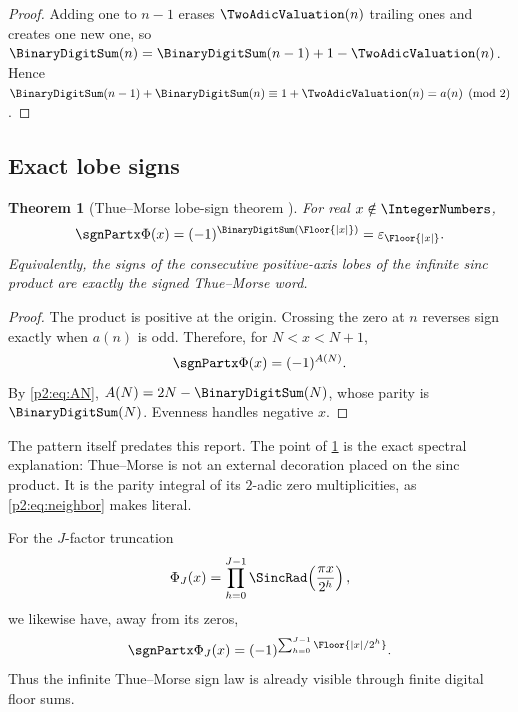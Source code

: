\documentclass[11pt]{article}
\numberwithin{equation}{section}
\newtheorem{theorem}{Theorem}[section]
\theoremstyle{definition}
\theoremstyle{remark}
\begin{document}
\begin{proof}
Adding one to $n-1$ erases $\TwoAdicValuation(n)$ trailing ones and creates one new one, so
$\BinaryDigitSum(n)=\BinaryDigitSum(n-1)+1-\TwoAdicValuation(n)$.  Hence
$\BinaryDigitSum(n-1)+\BinaryDigitSum(n)\equiv1+\TwoAdicValuation(n)=a(n)\pmod2$.
\end{proof}

\subsection{Exact lobe signs}

\begin{theorem}[Thue--Morse lobe-sign theorem \Observed]
\label{p2:thm:lobe-sign}
For real $x\notin\IntegerNumbers$,
\begin{equation}
 \sgnPartx\Phi(x)=(-1)^{\BinaryDigitSum(\Floor{|x|})}
             =\varepsilon_{\Floor{|x|}}.                  \label{p2:eq:lobe-sign}
\end{equation}
Equivalently, the signs of the consecutive positive-axis lobes of the infinite
sinc product are exactly the signed Thue--Morse word.
\end{theorem}

\begin{proof}
The product is positive at the origin.  Crossing the zero at $n$ reverses sign
exactly when $a(n)$ is odd.  Therefore, for $N<x<N+1$,
\[
 \sgnPartx\Phi(x)=(-1)^{A(N)}.
\]
By \eqref{p2:eq:AN}, $A(N)=2N-\BinaryDigitSum(N)$, whose parity is $\BinaryDigitSum(N)$.  Evenness handles
negative $x$.
\end{proof}

\begin{remark}
The pattern itself predates this report.  The point of
\cref{p2:thm:lobe-sign} is the exact spectral explanation: Thue--Morse is not an
external decoration placed on the sinc product.  It is the parity integral of
its $2$-adic zero multiplicities, as \eqref{p2:eq:neighbor} makes literal.
\end{remark}

For the $J$-factor truncation
\begin{equation}
 \Phi_J(x)=\prod_{h=0}^{J-1}\SincRad\!\left(\frac{\pi x}{2^h}\right),             \label{p2:eq:PhiJ}
\end{equation}
we likewise have, away from its zeros,
\begin{equation}
 \sgnPartx\Phi_J(x)=(-1)^{\sum_{h=0}^{J-1}\Floor{|x|/2^h}}.     \label{p2:eq:finite-sign}
\end{equation}
Thus the infinite Thue--Morse sign law is already visible through finite digital
floor sums.
\end{document}
